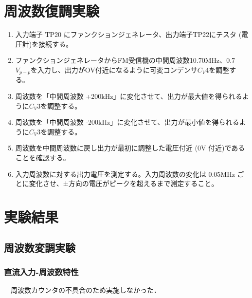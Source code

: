 \section{周波数復調実験}
\begin{enumerate}
  \item 入力端子 TP20 にファンクションジェネレータ、出力端子TP22にテスタ (電圧計)を接続する。\\
  \item ファンクションジェネレータからFM受信機の中間周波数10.70MHz、0.7$V_{p-p}$を入力し、出力がOV付近になるように可変コンデンサ$C_V4$を調整する。\\
  \item 周波数を「中間周波数 +200kHz」に変化させて、出力が最大値を得られるように$C_V3$を調整する。\\
  \item 周波数を「中間周波数 -200kHz」に変化させて、出力が最小値を得られるように$C_V3$を調整する。\\
  \item 周波数を中間周波数に戻し出力が最初に調整した電圧付近 (0V 付近)であることを確認する。\\
  \item 入力周波数に対する出力電圧を測定する。入力周波数の変化は 0.05MHz ごとに変化させ、±方向の電圧がピークを超えるまで測定すること。
\end{enumerate}

\section{実験結果}
\subsection{周波数変調実験}
\subsubsection{直流入力-周波数特性}
　周波数カウンタの不具合のため実施しなかった．\\

